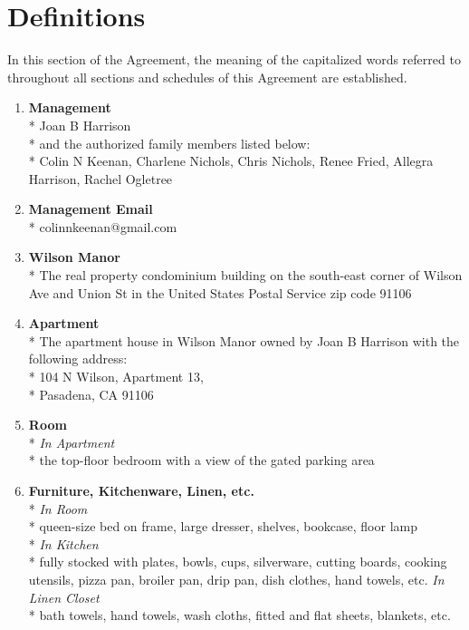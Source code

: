 \documentclass[12pt,letterpaper]{article}
\newcommand{\mom}{Joan B Harrison}
\newcommand{\management}{Management}
\newcommand{\myemail}{Management Email}
\newcommand{\condo}{Wilson Manor}
\newcommand{\apt}{Apartment}
\newcommand{\room}{Room}
\newcommand{\furniture}{Furniture, Kitchenware, Linen, etc.}
\begin{document}
\section{Definitions} \label{definitions}
In this section of the Agreement, the meaning of the capitalized words referred to throughout all sections and schedules of this Agreement are established.
\begin{multicols}{2}
	\begin{enumerate} 
		\item \textbf{\management{}}\\* \label{management}
			\noindent \mom{}\\*
			and the authorized family members listed below:\\*
			Colin N Keenan,
			Charlene Nichols,
			Chris Nichols,
			Renee Fried,
			Allegra Harrison,
			Rachel Ogletree
				
		\item \textbf{\myemail{}}\\* \label{myemail}
			colinnkeenan@gmail.com

		\item \textbf{\condo{}}\\* \label{condo}
			The real property condominium building on the south-east corner of Wilson Ave and Union St in the United States Postal Service zip code 91106

		\item \textbf{\apt{}}\\* \label{apt}
			The apartment house in \condo{} owned by \mom{} with the following address:\\*
			104 N Wilson, \apt{} 13,\\* 
			Pasadena, CA  91106

		\item \textbf{\room{}}\\* \label{room}
			\textit{In \apt{}}\\*
			the top-floor bedroom with a view of the gated parking area

		\item \textbf{\furniture{}}\\* \label{furniture}
			\textit{In \room{}}\\*
			queen-size bed on frame, large dresser, shelves, bookcase, floor lamp\\*
			\textit{In Kitchen}\\*
			fully stocked with plates, bowls, cups, silverware, cutting boards, cooking utensils, pizza pan, broiler pan, drip pan, dish clothes, hand towels, etc.
			\textit{In Linen Closet}\\*
			bath towels, hand towels, wash cloths, fitted and flat sheets, blankets, etc.


\end{enumerate}
\end{multicols}
\end{document}
